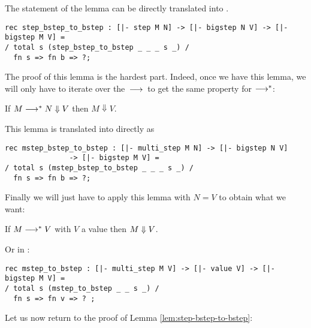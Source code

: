 The statement of the lemma can be directly translated into \beluga.

\begin{lstlisting}
rec step_bstep_to_bstep : [|- step M N] -> [|- bigstep N V] -> [|- bigstep M V] =
/ total s (step_bstep_to_bstep _ _ _ s _) /
  fn s => fn b => ?;
\end{lstlisting}

The proof of this lemma is the hardest part. Indeed, once we have this lemma, we will only
have to iterate over the $\mathrel{\,\longrightarrow\,}$ to get the same property for $\longrightarrow^*$:

\begin{lemma}\label{lem:mstep-bstep-to-bstep}
  If $M \longrightarrow^* N \Downarrow V$ then $M \Downarrow V$.
\end{lemma}

This lemma is translated into \beluga directly as

  \begin{lstlisting}
rec mstep_bstep_to_bstep : [|- multi_step M N] -> [|- bigstep N V]
			   -> [|- bigstep M V] =
/ total s (mstep_bstep_to_bstep _ _ _ s _) /
  fn s => fn b => ?;
  \end{lstlisting}

Finally we will just have to apply this lemma with $N = V$ to obtain what we
want:

\begin{proposition}\label{prop:mstep-to-bstep}
  If $M \longrightarrow^* V$ with $V$ a value then $M \Downarrow V$.
\end{proposition}

Or in \beluga:

\begin{lstlisting}
rec mstep_to_bstep : [|- multi_step M V] -> [|- value V] -> [|- bigstep M V] =
/ total s (mstep_to_bstep _ _ s _) /
  fn s => fn v => ? ;
\end{lstlisting}


Let us now return to the proof of Lemma \ref{lem:step-bstep-to-bstep}:

